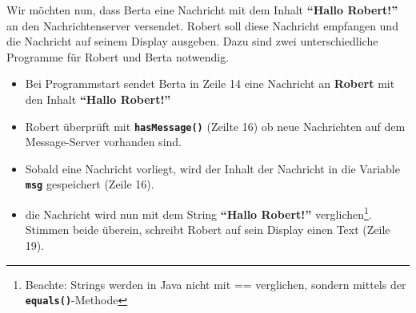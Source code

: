 \documentclass[
	12pt,
	article,
	type=bsc, %
	colorbacktitle,
	instlogo,
	accentcolor=tud1c,
	german,
	twoside
]{tudexercise}
\newcommand{\solpath}[0]{../../impl/androidApp/app/src/main/java/org/mindroid/android/app/programs/workshop/solutions}
\newcommand{\bfcode}[1]{\texttt{\textbf{#1}}}
\begin{document}
	Wir möchten nun, dass Berta eine Nachricht mit dem Inhalt \textbf{``Hallo Robert!''} an den Nachrichtenserver versendet. Robert soll diese Nachricht empfangen und die Nachricht auf seinem Display ausgeben. 
	Dazu sind zwei unterschiedliche Programme für Robert und Berta notwendig.
	
	\begin{itemize}
	\item Bei Programmstart sendet Berta in Zeile 14 eine Nachricht an \textbf{Robert }mit den Inhalt \textbf{``Hallo Robert!''}
	\end{itemize}
	
	
	
	\begin{itemize}
	\item Robert überprüft mit \bfcode{hasMessage()} (Zeilte 16) ob neue Nachrichten auf dem Message-Server vorhanden sind. 
	\item Sobald eine Nachricht vorliegt, wird der Inhalt der Nachricht in die Variable \bfcode{msg} gespeichert (Zeile 16).
	\item die Nachricht wird nun mit dem String \textbf{``Hallo Robert!''} verglichen\footnote{Beachte: Strings werden in Java nicht mit == verglichen, sondern mittels der \bfcode{equals()}-Methode}. Stimmen beide überein, schreibt Robert auf sein Display einen Text (Zeile 19).
	\end{itemize}
	
\end{document}
